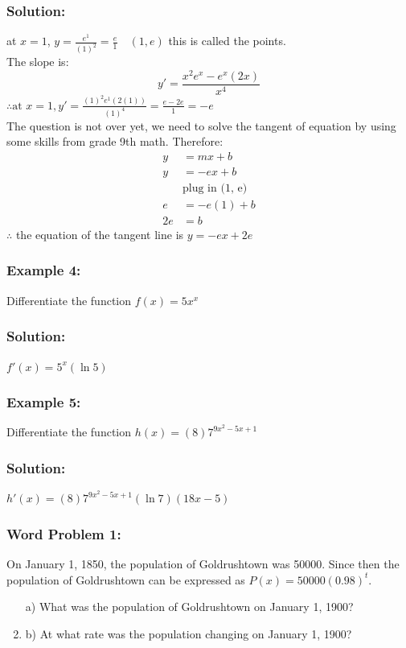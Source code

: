 \documentclass{article}
\begin{document}
\subsubsection*{Solution: }
at $x=1$, $y=\frac{e^1}{(1)^2}=\frac{e}{1} \quad (1, e)$ this is called the points.\\
The slope is:
$$y'=\frac{x^2e^x-e^x(2x)}{x^4}$$
$\therefore \text{at } x=1, y'=\frac{(1)^2e^1(2(1))}{(1)^4}= \frac{e-2e}{1}=-e$ \\
The question is not over yet, we need to solve the tangent of equation by using some skills from grade 9th math. Therefore:
\begin{align*}
    y&=mx+b\\
    y&=-ex+b\\
    &\text{plug in (1, e)}\\
    e&=-e(1)+b\\
    2e&=b
\end{align*}
$\therefore$ the equation of the tangent line is $y=-ex+2e$
\subsubsection*{Example 4:}
Differentiate the function $f(x)=5x^x$
\subsubsection*{Solution: }
$f'(x)=5^x(\ln 5)$
\subsubsection*{Example 5:}
Differentiate the function $h(x)=(8)7^{9x^2-5x+1}$
\subsubsection*{Solution: }
$h'(x)=(8)7^{9x^2-5x+1}(\ln 7)(18x-5)$

\subsubsection*{Word Problem 1:}
On January 1, 1850, the population of Goldrushtown was 50000. Since then the population of Goldrushtown can be expressed as $P(x)=50000(0.98)^t$.
\begin{enumerate}
    \item[a)] What was the population of Goldrushtown on January 1, 1900?
    \item{b)} At what rate was the population changing on January 1, 1900? 
\end{enumerate}
\end{document}
